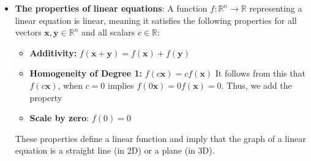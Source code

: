 \documentclass{report}
\begin{document}
    \pagebreak 
    \begin{itemize}
        \item \textbf{The properties of linear equations}:
            A function \( f: \mathbb{R}^n \rightarrow \mathbb{R} \) representing a linear equation is linear, meaning it satisfies the following properties for all vectors \( \mathbf{x}, \mathbf{y} \in \mathbb{R}^n \) and all scalars \( c \in \mathbb{R} \):
            \begin{itemize}
                \item \textbf{Additivity:} \( f(\mathbf{x} + \mathbf{y}) = f(\mathbf{x}) + f(\mathbf{y}) \)
                \item \textbf{Homogeneity of Degree 1:} \( f(c\mathbf{x}) = cf(\mathbf{x}) \)
                    \bigbreak \noindent 
                    It follows from this that $f(c\mathbf{x})$, when $c=0$ implies $f(0 \mathbf{x}) = 0 f(\mathbf{x}) = 0$. Thus, we add the property
                \item \textbf{Scale by zero}: $f(0) = 0$
            \end{itemize}
            These properties define a linear function and imply that the graph of a linear equation is a straight line (in 2D) or a plane (in 3D).

    \end{itemize}

    \pagebreak 

    \pagebreak 
    \begin{itemize}
        
    \end{itemize}





    
\end{document}
